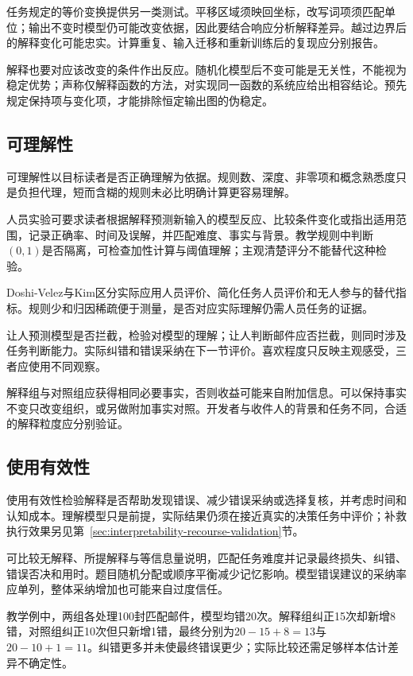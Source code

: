 任务规定的等价变换提供另一类测试。平移区域须映回坐标，改写词项须匹配单位；输出不变时模型仍可能改变依据，因此要结合响应分析解释差异。越过边界后的解释变化可能忠实。计算重复、输入迁移和重新训练后的复现应分别报告。

解释也要对应该改变的条件作出反应。随机化模型后不变可能是无关性，不能视为稳定优势；声称仅解释函数的方法，对实现同一函数的系统应给出相容结论。预先规定保持项与变化项，才能排除恒定输出图的伪稳定。

\subsection{可理解性}
\label{sec:interpretability-quality-comprehensibility}

可理解性以目标读者是否正确理解为依据。规则数、深度、非零项和概念熟悉度只是负担代理，短而含糊的规则未必比明确计算更容易理解。

人员实验可要求读者根据解释预测新输入的模型反应、比较条件变化或指出适用范围，记录正确率、时间及误解，并匹配难度、事实与背景。教学规则中判断$(0,1)$是否隔离，可检查加性计算与阈值理解；主观清楚评分不能替代这种检验。

Doshi-Velez与Kim区分实际应用人员评价、简化任务人员评价和无人参与的替代指标。规则少和归因稀疏便于测量，是否对应实际理解仍需人员任务的证据。

让人预测模型是否拦截，检验对模型的理解；让人判断邮件应否拦截，则同时涉及任务判断能力。实际纠错和错误采纳在下一节评价。喜欢程度只反映主观感受，三者应使用不同观察。

解释组与对照组应获得相同必要事实，否则收益可能来自附加信息。可以保持事实不变只改变组织，或另做附加事实对照。开发者与收件人的背景和任务不同，合适的解释粒度应分别验证。

\subsection{使用有效性}
\label{sec:interpretability-quality-utility}

使用有效性检验解释是否帮助发现错误、减少错误采纳或选择复核，并考虑时间和认知成本。理解模型只是前提，实际结果仍须在接近真实的决策任务中评价；补救执行效果另见第~\ref{sec:interpretability-recourse-validation}节。

可比较无解释、所提解释与等信息量说明，匹配任务难度并记录最终损失、纠错、错误否决和用时。题目随机分配或顺序平衡减少记忆影响。模型错误建议的采纳率应单列，整体采纳增加也可能来自过度信任。

教学例中，两组各处理100封匹配邮件，模型均错20次。解释组纠正15次却新增8错，对照组纠正10次但只新增1错，最终分别为$20-15+8=13$与$20-10+1=11$。纠错更多并未使最终错误更少；实际比较还需足够样本估计差异不确定性。

